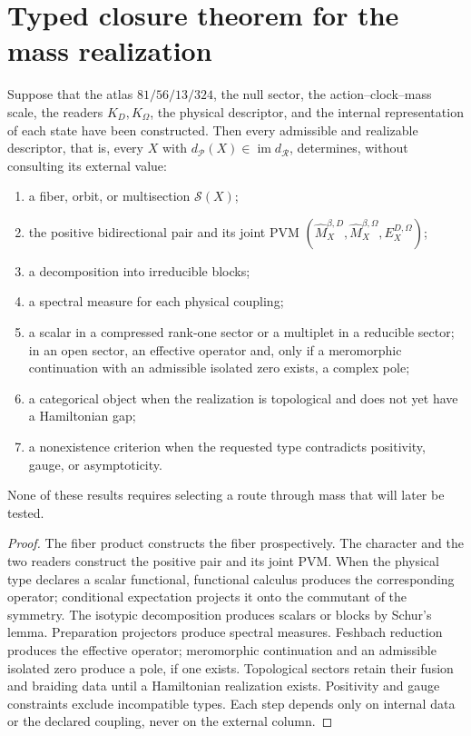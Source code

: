 \section{Typed closure theorem for the mass realization}

\begin{theorem}
Suppose that the atlas \(81/56/13/324\), the null sector, the
action--clock--mass scale, the readers \(K_D,K_\Omega\), the physical descriptor, and the
internal representation of each state have been constructed. Then every admissible and
realizable descriptor, that is, every \(X\) with
\(d_{\mathcal P}(X)\in\operatorname{im}d_{\mathcal R}\),
determines, without consulting its external value:
\begin{enumerate}
\item a fiber, orbit, or multisection \(\mathscr S(X)\);
\item the positive bidirectional pair and its joint PVM
      \((\widehat M_X^{\beta,D},\widehat M_X^{\beta,\Omega},
      E_X^{D,\Omega})\);
\item a decomposition into irreducible blocks;
\item a spectral measure for each physical coupling;
\item a scalar in a compressed rank-one sector or a multiplet in a
      reducible sector; in an open sector, an effective operator and, only if
      a meromorphic continuation with an admissible isolated zero exists, a
      complex pole;
\item a categorical object when the realization is topological and does not yet have
      a Hamiltonian gap;
\item a nonexistence criterion when the requested type contradicts
      positivity, gauge, or asymptoticity.
\end{enumerate}
None of these results requires selecting a route through mass
that will later be tested.
\end{theorem}

\begin{proof}
The fiber product constructs the fiber prospectively. The character and the
two readers construct the positive pair and its joint PVM. When the physical
type declares a scalar functional, functional calculus produces the corresponding
operator; conditional expectation projects it onto the commutant of the
symmetry. The isotypic decomposition produces scalars or blocks by Schur's
lemma. Preparation projectors produce spectral measures.
Feshbach reduction produces the effective operator; meromorphic continuation
and an admissible isolated zero produce a pole, if one exists. Topological
sectors retain their fusion and braiding data until a Hamiltonian
realization exists. Positivity and gauge constraints
exclude incompatible types. Each step depends only on internal data or
the declared coupling, never on the external column.
\end{proof}

